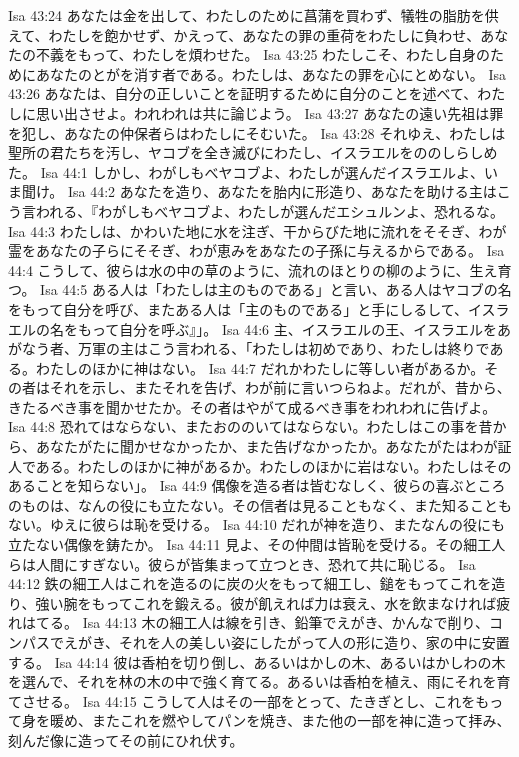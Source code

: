 Isa 43:24  あなたは金を出して、わたしのために菖蒲を買わず、犠牲の脂肪を供えて、わたしを飽かせず、かえって、あなたの罪の重荷をわたしに負わせ、あなたの不義をもって、わたしを煩わせた。
Isa 43:25  わたしこそ、わたし自身のためにあなたのとがを消す者である。わたしは、あなたの罪を心にとめない。
Isa 43:26  あなたは、自分の正しいことを証明するために自分のことを述べて、わたしに思い出させよ。われわれは共に論じよう。
Isa 43:27  あなたの遠い先祖は罪を犯し、あなたの仲保者らはわたしにそむいた。
Isa 43:28  それゆえ、わたしは聖所の君たちを汚し、ヤコブを全き滅びにわたし、イスラエルをののしらしめた。
Isa 44:1  しかし、わがしもべヤコブよ、わたしが選んだイスラエルよ、いま聞け。
Isa 44:2  あなたを造り、あなたを胎内に形造り、あなたを助ける主はこう言われる、『わがしもべヤコブよ、わたしが選んだエシュルンよ、恐れるな。
Isa 44:3  わたしは、かわいた地に水を注ぎ、干からびた地に流れをそそぎ、わが霊をあなたの子らにそそぎ、わが恵みをあなたの子孫に与えるからである。
Isa 44:4  こうして、彼らは水の中の草のように、流れのほとりの柳のように、生え育つ。
Isa 44:5  ある人は「わたしは主のものである」と言い、ある人はヤコブの名をもって自分を呼び、またある人は「主のものである」と手にしるして、イスラエルの名をもって自分を呼ぶ』」。
Isa 44:6  主、イスラエルの王、イスラエルをあがなう者、万軍の主はこう言われる、「わたしは初めであり、わたしは終りである。わたしのほかに神はない。
Isa 44:7  だれかわたしに等しい者があるか。その者はそれを示し、またそれを告げ、わが前に言いつらねよ。だれが、昔から、きたるべき事を聞かせたか。その者はやがて成るべき事をわれわれに告げよ。
Isa 44:8  恐れてはならない、またおののいてはならない。わたしはこの事を昔から、あなたがたに聞かせなかったか、また告げなかったか。あなたがたはわが証人である。わたしのほかに神があるか。わたしのほかに岩はない。わたしはそのあることを知らない」。
Isa 44:9  偶像を造る者は皆むなしく、彼らの喜ぶところのものは、なんの役にも立たない。その信者は見ることもなく、また知ることもない。ゆえに彼らは恥を受ける。
Isa 44:10  だれが神を造り、またなんの役にも立たない偶像を鋳たか。
Isa 44:11  見よ、その仲間は皆恥を受ける。その細工人らは人間にすぎない。彼らが皆集まって立つとき、恐れて共に恥じる。
Isa 44:12  鉄の細工人はこれを造るのに炭の火をもって細工し、鎚をもってこれを造り、強い腕をもってこれを鍛える。彼が飢えれば力は衰え、水を飲まなければ疲れはてる。
Isa 44:13  木の細工人は線を引き、鉛筆でえがき、かんなで削り、コンパスでえがき、それを人の美しい姿にしたがって人の形に造り、家の中に安置する。
Isa 44:14  彼は香柏を切り倒し、あるいはかしの木、あるいはかしわの木を選んで、それを林の木の中で強く育てる。あるいは香柏を植え、雨にそれを育てさせる。
Isa 44:15  こうして人はその一部をとって、たきぎとし、これをもって身を暖め、またこれを燃やしてパンを焼き、また他の一部を神に造って拝み、刻んだ像に造ってその前にひれ伏す。
